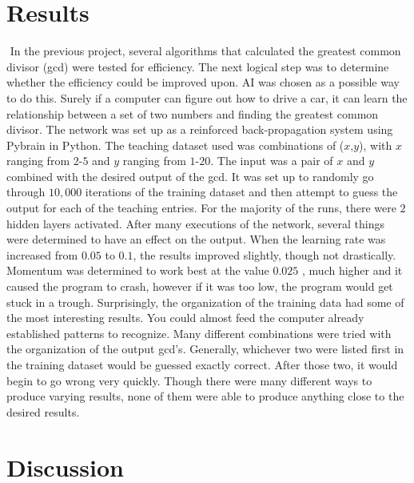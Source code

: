 \documentclass[11pt]{article}
\begin{document}
\section{Results}$ $
\indent In the previous project, several algorithms that calculated the greatest common divisor (gcd) were tested for efficiency.  The next logical step was to determine whether the efficiency could be improved upon.  AI was chosen as a possible way to do this.  Surely if a computer can figure out how to drive a car, it can learn the relationship between a set of two numbers and finding the greatest common divisor.  The network was set up as a reinforced back-propagation system using Pybrain in Python.  The teaching dataset used was combinations of ($x$,$y$), with $x$ ranging from $2$-$5$ and $y$ ranging from $1$-$20$.  The input was a pair of $x$ and $y$ combined with the desired output of the gcd.  It was set up to randomly go through $10,000$ iterations of the training dataset and then attempt to guess the output for each of the teaching entries.  For the majority of the runs, there were $2$ hidden layers activated.  
After many executions of the network, several things were determined to have an effect on the output.  When the learning rate was increased from $0.05$ to $0.1$, the results improved slightly, though not drastically. Momentum was determined to work best at the value $0.025$ , much higher and it caused the program to crash, however if it was too low, the program would get stuck in a trough.  Surprisingly, the organization of the training data had some of the most interesting results.  You could almost feed the computer already established patterns to recognize.  Many different combinations were tried with the organization of the output gcd’s.  Generally, whichever two were listed first in the training dataset would be guessed exactly correct.  After those two, it would begin to go wrong very quickly.  Though there were many different ways to produce varying results, none of them were able to produce anything close to the desired results.

\section{Discussion}$ $
\end{document}
